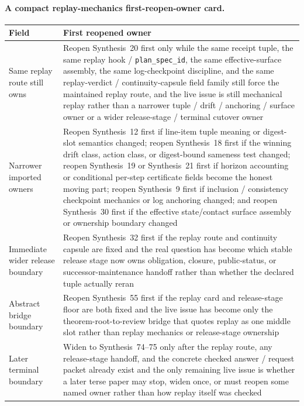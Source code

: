 \documentclass[11pt]{article}
\begin{document}
\paragraph{A compact replay-mechanics first-reopen-owner card.}
\begin{table}[t]
\centering
\small
\begin{tabularx}{\linewidth}{@{}lX@{}}
\toprule
Field & First reopened owner \\
\midrule
Same replay route still owns & Reopen Synthesis~20 first only while the same receipt tuple, the same replay hook / \texttt{plan\_spec\_id}, the same effective-surface assembly, the same log-checkpoint discipline, and the same replay-verdict / continuity-capsule field family still force the maintained replay route, and the live issue is still mechanical replay rather than a narrower tuple / drift / anchoring / surface owner or a wider release-stage / terminal cutover owner \\
Narrower imported owners & Reopen Synthesis~12 first if line-item tuple meaning or digest-slot semantics changed; reopen Synthesis~18 first if the winning drift class, action class, or digest-bound sameness test changed; reopen Synthesis~19 or Synthesis~21 first if horizon accounting or conditional per-step certificate fields become the honest moving part; reopen Synthesis~9 first if inclusion / consistency checkpoint mechanics or log anchoring changed; and reopen Synthesis~30 first if the effective state/contact surface assembly or ownership boundary changed \\
Immediate wider release boundary & Reopen Synthesis~32 first if the replay route and continuity capsule are fixed and the real question has become which stable release stage now owns obligation, closure, public-status, or successor-maintenance handoff rather than whether the declared tuple actually reran \\
Abstract bridge boundary & Reopen Synthesis~55 first if the replay card and release-stage floor are both fixed and the live issue has become only the theorem-root-to-review bridge that quotes replay as one middle slot rather than replay mechanics or release-stage ownership \\
Later terminal boundary & Widen to Synthesis~74--75 only after the replay route, any release-stage handoff, and the concrete checked answer / request packet already exist and the only remaining live issue is whether a later terse paper may stop, widen once, or must reopen some named owner rather than how replay itself was checked \\

\end{tabularx}
\end{table}
\end{document}
